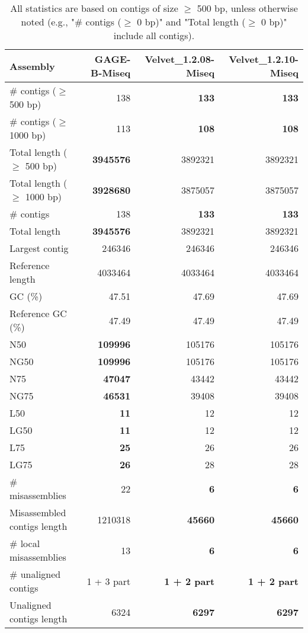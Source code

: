 \documentclass[12pt,a4paper]{article}
\begin{document}
\begin{table}[ht]
\begin{center}
\caption{All statistics are based on contigs of size $\geq$ 500 bp, unless otherwise noted (e.g., "\# contigs ($\geq$ 0 bp)" and "Total length ($\geq$ 0 bp)" include all contigs).}
\begin{tabular}{|l*{3}{|r}|}
\hline
Assembly & GAGE-B-Miseq & Velvet\_1.2.08-Miseq & Velvet\_1.2.10-Miseq \\ \hline
\# contigs ($\geq$ 500 bp) & 138 & {\bf 133} & {\bf 133} \\ \hline
\# contigs ($\geq$ 1000 bp) & 113 & {\bf 108} & {\bf 108} \\ \hline
Total length ($\geq$ 500 bp) & {\bf 3945576} & 3892321 & 3892321 \\ \hline
Total length ($\geq$ 1000 bp) & {\bf 3928680} & 3875057 & 3875057 \\ \hline
\# contigs & 138 & {\bf 133} & {\bf 133} \\ \hline
Total length & {\bf 3945576} & 3892321 & 3892321 \\ \hline
Largest contig & 246346 & 246346 & 246346 \\ \hline
Reference length & 4033464 & 4033464 & 4033464 \\ \hline
GC (\%) & 47.51 & 47.69 & 47.69 \\ \hline
Reference GC (\%) & 47.49 & 47.49 & 47.49 \\ \hline
N50 & {\bf 109996} & 105176 & 105176 \\ \hline
NG50 & {\bf 109996} & 105176 & 105176 \\ \hline
N75 & {\bf 47047} & 43442 & 43442 \\ \hline
NG75 & {\bf 46531} & 39408 & 39408 \\ \hline
L50 & {\bf 11} & 12 & 12 \\ \hline
LG50 & {\bf 11} & 12 & 12 \\ \hline
L75 & {\bf 25} & 26 & 26 \\ \hline
LG75 & {\bf 26} & 28 & 28 \\ \hline
\# misassemblies & 22 & {\bf 6} & {\bf 6} \\ \hline
Misassembled contigs length & 1210318 & {\bf 45660} & {\bf 45660} \\ \hline
\# local misassemblies & 13 & {\bf 6} & {\bf 6} \\ \hline
\# unaligned contigs & 1 + 3 part & {\bf 1 + 2 part} & {\bf 1 + 2 part} \\ \hline
Unaligned contigs length & 6324 & {\bf 6297} & {\bf 6297} \\ \hline

\end{tabular}
\end{center}
\end{table}
\end{document}
